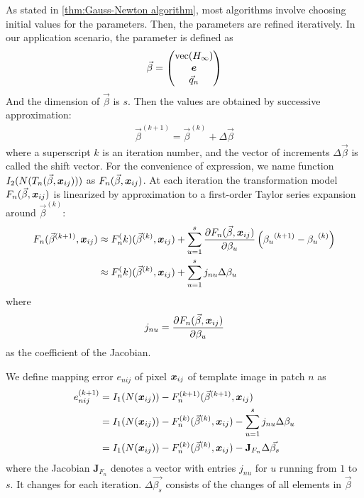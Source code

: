 As stated in \cref{thm:Gauss-Newton algorithm}, most algorithms involve choosing initial values for the parameters. Then, the parameters are refined iteratively. In our application scenario, the parameter is defined as 
\begin{align}\label{eq:beta}
	\vec{\beta} =  \begin{pmatrix}\operatorname {vec}(H_\infty)\\\boldsymbol{e}\\ \vec{q}_n \end{pmatrix}
\end{align}
 And the dimension of $\vec{\beta}$ is $s$. Then the values are obtained by successive approximation:
\begin{align}
	\vec{\beta}^{(k+1)} =  \vec{\beta}^{(k)} + \Delta \vec{\beta}
\end{align}
where a superscript $k$ is an iteration number, and the vector of increments $\Delta \vec{\beta}$ is called the shift vector.  For the convenience of expression, we name function $I_2(N(T_n(\vec{\beta}, \boldsymbol{x}_{ij})))$ as $F_n(\vec{\beta}, \boldsymbol{x}_{ij})$. At each iteration the transformation model $F_n(\vec{\beta}, \boldsymbol{x}_{ij})$ is linearized by approximation to a first-order Taylor series expansion around $\vec{\beta}^{(k)}$:
\begin{align}
	F_n(\vec{\beta}^{(k+1)}, \boldsymbol{x}_{ij}) &\approx F_n^(k)(\vec{\beta}^{(k)}, \boldsymbol{x}_{ij})+ \sum_{u=1}^s \frac{\partial F_n(\vec{\beta}, \boldsymbol{x}_{ij})}{\partial \beta_u} \left({\beta_u}^{(k+1)}-{\beta_u}^{(k)} \right) \nonumber \\
	& \approx F_n^(k)(\vec{\beta}^{(k)}, \boldsymbol{x}_{ij}) + \sum_{u=1}^s j_{nu}\Delta\beta_u
\end{align}
where 
\begin{align} \label{eq:Jacobian}
j_{nu} = \frac{\partial F_n(\vec{\beta}, \boldsymbol{x}_{ij})}{\partial \beta_u}
\end{align}
as the coefficient of the Jacobian.

We define mapping error $e_{nij}$ of pixel $\boldsymbol{x}_{ij}$ of template image in patch $n$ as
\begin{align}\label{eq:e}
	e_{nij}^{(k+1)} & = I_1(N(\boldsymbol{x}_{ij}))- F^{(k+1)}_n(\vec{\beta}^{(k+1)}, \boldsymbol{x}_{ij}) \nonumber \\
	   & = I_1(N(\boldsymbol{x}_{ij})) - F_n^{(k)}(\vec{\beta}^{(k)}, \boldsymbol{x}_{ij}) - \sum_{u=1}^s j_{nu}\Delta\beta_u \nonumber \\
	   & = I_1(N(\boldsymbol{x}_{ij})) - F_n^{(k)}(\vec{\beta}^{(k)}, \boldsymbol{x}_{ij}) - \mathbf{J}_{F_n} \Delta\vec{\beta_s}
\end{align}
where the Jacobian $\mathbf{J}_{F_n}$ denotes a vector with entries $j_{nu}$ for $u$ running from $1$ to $s$. It changes for each iteration. $\Delta\vec{\beta_s}$ consists of the changes of all elements in $\vec{\beta}$

